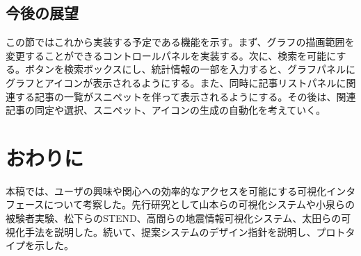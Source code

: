 \documentclass{matsushita-zemi}
\begin{document}
\subsection{今後の展望}
この節ではこれから実装する予定である機能を示す。まず、グラフの描画範囲を変更することができるコントロールパネルを実装する。次に、検索を可能にする。ボタンを検索ボックスにし、統計情報の一部を入力すると、グラフパネルにグラフとアイコンが表示されるようにする。また、同時に記事リストパネルに関連する記事の一覧がスニペットを伴って表示されるようにする。その後は、関連記事の同定や選択、スニペット、アイコンの生成の自動化を考えていく。


\section{おわりに}
本稿では、ユーザの興味や関心への効率的なアクセスを可能にする可視化インタフェースについて考察した。先行研究として山本らの可視化システムや小泉らの被験者実験、松下らのSTEND、高間らの地震情報可視化システム、太田らの可視化手法を説明した。続いて、提案システムのデザイン指針を説明し、プロトタイプを示した。



\end{document}
